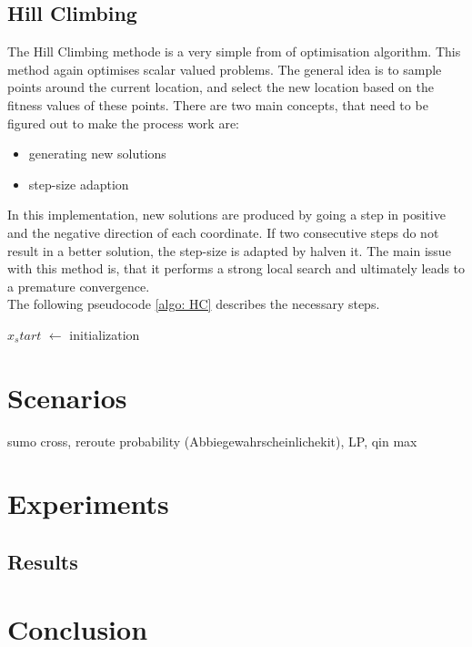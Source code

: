 \documentclass[./\jobname.tex]{subfiles}
\begin{document}
\section{Hill Climbing}

The Hill Climbing methode is a very simple from of optimisation algorithm. This method again optimises scalar valued problems. The general idea is to sample points around the current location, and select the new location based on the fitness values of these points. There are two main concepts, that need to be figured out to make the process work are: 
\begin{itemize}
	\item generating new solutions 
	\item step-size adaption\\
\end{itemize}

In this implementation, new solutions are produced by going a step in positive and the negative direction of each coordinate. If two consecutive steps do not result in a better solution, the step-size is adapted by halven it. The main issue with this method is, that it performs a strong local search and ultimately leads to a premature convergence. \\

The following pseudocode \ref{algo: HC} describes the necessary steps. 

\begin{algorithm}[H]
	\SetAlgoNoLine
	\DontPrintSemicolon
	$x_start$ $\gets$ initialization\;
	\label{algo: HC}
\end{algorithm}


\chapter{Scenarios}
sumo cross, reroute probability (Abbiegewahrscheinlichekit), LP, qin max

\chapter{Experiments}

\section{Results}

\chapter{Conclusion}
\end{document}
